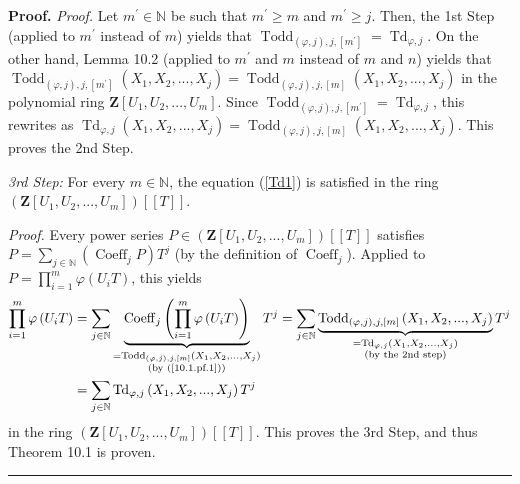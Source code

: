 \documentclass[numbers=enddot,12pt,final,onecolumn,notitlepage]{scrartcl}%
\newenvironment{proof}[1][Proof]{\noindent\textbf{#1.} }{\ \rule{0.5em}{0.5em}}
\begin{document}
\begin{proof}
\textit{Proof.} Let $m^{\prime}\in\mathbb{N}$ be such that $m^{\prime}\geq m$
and $m^{\prime}\geq j$. Then, the 1st Step (applied to $m^{\prime}$ instead of
$m$) yields that $\operatorname*{Todd}\nolimits_{\left(  \varphi,j\right)
,j,\left[  m^{\prime}\right]  }=\operatorname*{Td}\nolimits_{\varphi,j}$. On
the other hand, Lemma 10.2 (applied to $m^{\prime}$ and $m$ instead of $m$ and
$n$) yields that $\operatorname*{Todd}\nolimits_{\left(  \varphi,j\right)
,j,\left[  m^{\prime}\right]  }\left(  X_{1},X_{2},...,X_{j}\right)
=\operatorname*{Todd}\nolimits_{\left(  \varphi,j\right)  ,j,\left[  m\right]
}\left(  X_{1},X_{2},...,X_{j}\right)  $ in the polynomial ring $\mathbf{Z}%
\left[  U_{1},U_{2},...,U_{m}\right]  $. Since $\operatorname*{Todd}%
\nolimits_{\left(  \varphi,j\right)  ,j,\left[  m^{\prime}\right]
}=\operatorname*{Td}\nolimits_{\varphi,j}$, this rewrites as
$\operatorname*{Td}\nolimits_{\varphi,j}\left(  X_{1},X_{2},...,X_{j}\right)
=\operatorname*{Todd}\nolimits_{\left(  \varphi,j\right)  ,j,\left[  m\right]
}\left(  X_{1},X_{2},...,X_{j}\right)  $. This proves the 2nd Step.

\textit{3rd Step:} For every $m\in\mathbb{N}$, the equation (\ref{Td1}) is
satisfied in the ring $\left(  \mathbf{Z}\left[  U_{1},U_{2},...,U_{m}\right]
\right)  \left[  \left[  T\right]  \right]  $.

\textit{Proof.} Every power series $P\in\left(  \mathbf{Z}\left[  U_{1}%
,U_{2},...,U_{m}\right]  \right)  \left[  \left[  T\right]  \right]  $
satisfies $P=\sum\limits_{j\in\mathbb{N}}\left(  \operatorname*{Coeff}%
\nolimits_{j}P\right)  T^{j}$ (by the definition of $\operatorname*{Coeff}%
\nolimits_{j}$). Applied to $P=\prod\limits_{i=1}^{m}\varphi\left(
U_{i}T\right)  $, this yields%
\begin{align*}
\prod\limits_{i=1}^{m}\varphi\left(  U_{i}T\right)   &  =\sum\limits_{j\in
\mathbb{N}}\underbrace{\operatorname*{Coeff}\nolimits_{j}\left(
\prod\limits_{i=1}^{m}\varphi\left(  U_{i}T\right)  \right)  }%
_{\substack{=\operatorname*{Todd}\nolimits_{\left(  \varphi,j\right)
,j,\left[  m\right]  }\left(  X_{1},X_{2},...,X_{j}\right)  \\\text{(by
(\ref{10.1.pf.1}))}}}T^{j}=\sum\limits_{j\in\mathbb{N}}%
\underbrace{\operatorname*{Todd}\nolimits_{\left(  \varphi,j\right)
,j,\left[  m\right]  }\left(  X_{1},X_{2},...,X_{j}\right)  }%
_{\substack{=\operatorname*{Td}\nolimits_{\varphi,j}\left(  X_{1}%
,X_{2},...,X_{j}\right)  \\\text{(by the 2nd step)}}}T^{j}\\
&  =\sum\limits_{j\in\mathbb{N}}\operatorname*{Td}\nolimits_{\varphi,j}\left(
X_{1},X_{2},...,X_{j}\right)  T^{j}%
\end{align*}
in the ring $\left(  \mathbf{Z}\left[  U_{1},U_{2},...,U_{m}\right]  \right)
\left[  \left[  T\right]  \right]  $. This proves the 3rd Step, and thus
Theorem 10.1 is proven.
\end{proof}
\end{document}
